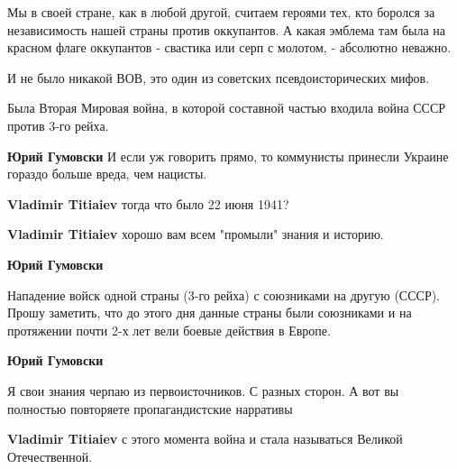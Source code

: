 \begin{itemize}
\begin{itemize}
Мы в своей стране, как в любой другой, считаем героями тех, кто боролся за
независимость нашей страны против оккупантов. А какая эмблема там была на
красном флаге оккупантов - свастика или серп с молотом, - абсолютно неважно. 

И не было никакой ВОВ, это один из советских псевдоисторических мифов. 

Была Вторая Мировая война, в которой составной частью входила война СССР против
3-го рейха.


\textbf{Юрий Гумовски} И если уж говорить прямо, то коммунисты принесли Украине гораздо больше вреда, чем нацисты.


\textbf{Vladimir Titiaiev} тогда что было 22 июня 1941?


\textbf{Vladimir Titiaiev} хорошо вам всем "промыли" знания и историю.


\textbf{Юрий Гумовски} 

Нападение войск одной страны (3-го рейха) с союзниками на другую (СССР). Прошу
заметить, что до этого дня данные страны были союзниками и на протяжении почти
2-х лет вели боевые действия в Европе.




\textbf{Юрий Гумовски} 

Я свои знания черпаю из первоисточников. С разных сторон. А вот вы полностью
повторяете пропагандистские нарративы


\textbf{Vladimir Titiaiev} с этого момента война и стала называться Великой Отечественной.


\end{itemize}
\end{itemize}
